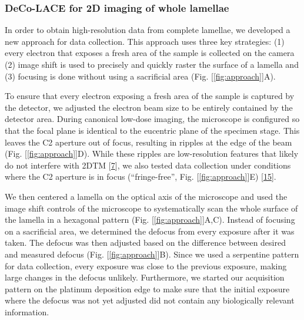\documentclass[
]{article}
\begin{document}
\hypertarget{deco-lace-for-2d-imaging-of-whole-lamellae}{%
\subsubsection{DeCo-LACE for 2D imaging of whole lamellae}\label{deco-lace-for-2d-imaging-of-whole-lamellae}}

In order to obtain high-resolution data from complete lamellae, we developed a new
approach for data collection. This approach uses three key strategies: (1) every
electron that exposes a fresh area of the sample is collected on the camera (2)
image shift is used to precisely and quickly raster the surface of a lamella and
(3) focusing is done without using a sacrificial area (Fig. {[}\ref{fig:approach}{]}A).

To ensure that every electron exposing a fresh area of the sample is captured by
the detector, we adjusted the electron beam size to be entirely contained by the
detector area. During canonical low-dose imaging, the microscope is configured so
that the focal plane is identical to the eucentric plane of the specimen stage.
This leaves the C2 aperture out of focus, resulting in ripples at the edge of
the beam (Fig. {[}\ref{fig:approach}{]}D). While these ripples are low-resolution
features that likely do not interfere with 2DTM {[}\protect\hyperlink{ref-Ynb3IP6I}{7}{]}, we also tested data
collection under conditions where the C2 aperture is in focus (``fringe-free'',
Fig. {[}\ref{fig:approach}{]}E) {[}\protect\hyperlink{ref-wsFP5c54}{15}{]}.

We then centered a lamella on the optical axis of the microscope and used the
image shift controls of the microscope to systematically scan the whole surface
of the lamella in a hexagonal pattern (Fig. {[}\ref{fig:approach}{]}A,C). Instead of
focusing on a sacrificial area, we determined the defocus from every exposure
after it was taken. The defocus was then adjusted based on the difference
between desired and measured defocus (Fig. {[}\ref{fig:approach}{]}B). Since we used a
serpentine pattern for data collection, every exposure was close to the previous
exposure, making large changes in the defocus unlikely. Furthermore, we started
our acquisition pattern on the platinum deposition edge to make sure that the
initial exposure where the defocus was not yet adjusted did not contain any
biologically relevant information.
\end{document}
